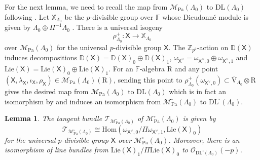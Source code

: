 \documentclass[10pt]{amsart}
\numberwithin{equation}{section}
\newtheorem{lemma}[equation]{Lemma}
\theoremstyle{definition}
\def\Lie{\mathrm{Lie}}
\def\Pa{\mathrm{Pa}}
\def\calM{\mathcal{M}}
\def\calO{\mathcal{O}}
\def\calT{\mathcal{T}}
\def\DD{\mathbb{D}}
\def\FF{\mathbb{F}}
\def\XX{\mathbb{X}}
\def\sfX{\mathsf{X}}
\def\ZZ{\mathbb{Z}}
\def\rmV{\mathrm{V}}
\def\rmR{\mathrm{R}}
\begin{document}
For the next lemma, we need to recall the map from $\calM_{\Pa}(\Lambda_{0})$ to $\mathrm{DL}(\Lambda_{0})$ following \cite[\S 4]{Wanga}. Let $\XX_{\Lambda_{0}}$ be the $p$-divisible group over $\FF$ whose Dieudonn\'{e}  module is given by $\Lambda_{0}\oplus \Pi^{-1}\Lambda_{0}$ \cite[Lemma 4.1]{Wanga}. There is a universal isogeny
\begin{equation}
\rho^{+}_{\Lambda_{0}}:\sfX\rightarrow\XX_{\Lambda_{0}}
\end{equation}
over $\calM_{\Pa}(\Lambda_{0})$ for the universal $p$-divisible group $\sfX$. The $\ZZ_{p^{2}}$-action on $\DD(\sfX)$ induces decompositions $\DD(\sfX)=\DD(\sfX)_{0}\oplus \DD(\sfX)_{1}$, $\omega_{\sfX^{\vee}}=\omega_{\sfX^{\vee},0}\oplus \omega_{\sfX^{\vee},1}$ and $\mathrm{Lie}(\sfX)=\mathrm{Lie}(\sfX)_{0}\oplus \mathrm{Lie}(\sfX)_{1}$. For an $\FF$-algebra $\rmR$ and any point $(\sfX, \lambda_{\sfX}, \iota_{\sfX}, \rho_{\sfX} )\in\calM_{\Pa}(\Lambda_{0})(\rmR)$, sending this point to $\rho^{+}_{\Lambda_{0}}(\omega_{\sfX^{\vee},0})\subset \overline{\rmV}_{\Lambda_{0}}\otimes\rmR$ gives the desired map from $\calM_{\Pa}(\Lambda_{0})$ to $\mathrm{DL}(\Lambda_{0})$ which is in fact an isomorphism by \cite[Proposition 4.12]{Wanga} and induces an isomorphism from $\calM^{\square}_{\Pa}(\Lambda_{0})$ to $\mathrm{DL}^{\square}(\Lambda_{0})$.
\begin{lemma}\label{tan-0}
The tangent bundle $\calT_{\calM^{\square}_{\Pa}(\Lambda_{0})}$ of $\calM^{\square}_{\Pa}(\Lambda_{0})$ is given by
\begin{equation*}
\calT_{\calM^{\square}_{\Pa}(\Lambda_{0})}\cong \mathrm{Hom}(\omega_{\sfX^{\vee},0}/\Pi\omega_{\sfX^{\vee},1}, \Lie(\sfX)_{0})
\end{equation*}
for the universal $p$-divisible group $\sfX$ over $\calM^{\square}_{\Pa}(\Lambda_{0})$. Moreover, there is an isomorphism of line bundles from $\Lie(\sfX)_{1}/\Pi\Lie(\sfX)_{0}$ to $\calO_{\mathrm{DL}^{\square}(\Lambda_{0})}(-p)$.
\end{lemma}
\end{document}
